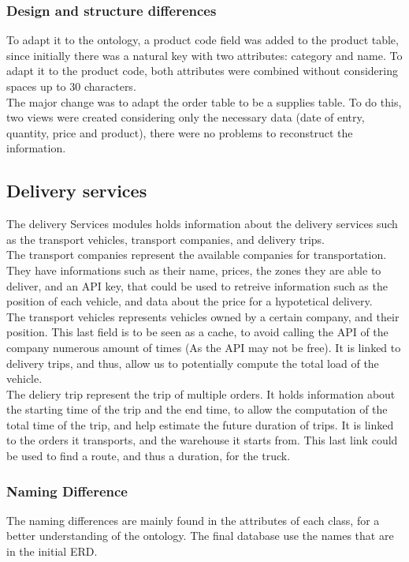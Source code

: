 \documentclass{article}
\begin{document}
\subsubsection{Design and structure differences}
To adapt it to the ontology, a product code field was added to the product table, since initially there was a natural key with two attributes: category and name. To adapt it to the product code, both attributes were combined without considering spaces up to 30 characters. \\

The major change was to adapt the order table to be a supplies table. To do this, two views were created considering only the necessary data (date of entry, quantity, price and product), there were no problems to reconstruct the information.

\subsection{Delivery services}
The delivery Services modules holds information about the delivery services such as the transport vehicles, transport companies, and delivery trips. \\

The transport companies represent the available companies for transportation. They have informations such as their name, prices, the zones they are able to deliver, and an API key, that could be used to retreive information such as the position of each vehicle, and data about the price for a hypotetical delivery. \\

The transport vehicles represents vehicles owned by a certain company, and their position. This last field is to be seen as a cache, to avoid calling the API of the company numerous amount of times (As the API may not be free). It is linked to delivery trips, and thus, allow us to potentially compute the total load of the vehicle. \\

The deliery trip represent the trip of multiple orders. It holds information about the starting time of the trip and the end time, to allow the computation of the total time of the trip, and help estimate the future duration of trips. It is linked to the orders it transports, and the warehouse it starts from. This last link could be used to find a route, and thus a duration, for the truck. \\

\subsubsection{Naming Difference}
The naming differences are mainly found in the attributes of each class, for a better understanding of the ontology. The final database use the names that are in the initial ERD.
\end{document}
